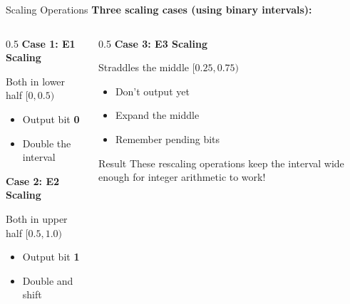 \documentclass[aspectratio=169,12pt]{beamer}
\begin{document}
\begin{frame}{Scaling Operations}
    \textbf{Three scaling cases (using binary intervals):}
    
    \vspace{0.3cm}
    \begin{columns}
        \begin{column}{0.5\textwidth}
            \textbf{Case 1: E1 Scaling}
            
            Both in lower half $[0, 0.5)$
            \begin{itemize}
                \item Output bit \textbf{0}
                \item Double the interval
            \end{itemize}
            
            \vspace{0.3cm}
            \textbf{Case 2: E2 Scaling}
            
            Both in upper half $[0.5, 1.0)$
            \begin{itemize}
                \item Output bit \textbf{1}
                \item Double and shift
            \end{itemize}
        \end{column}
        \begin{column}{0.5\textwidth}
            \textbf{Case 3: E3 Scaling}
            
            Straddles the middle $[0.25, 0.75)$
            \begin{itemize}
                \item Don't output yet
                \item Expand the middle
                \item Remember pending bits
            \end{itemize}
            
            \vspace{0.3cm}
            \begin{block}{Result}
                These rescaling operations keep the interval wide enough for integer arithmetic to work!
            \end{block}
        \end{column}
    \end{columns}
\end{frame}
\end{document}
